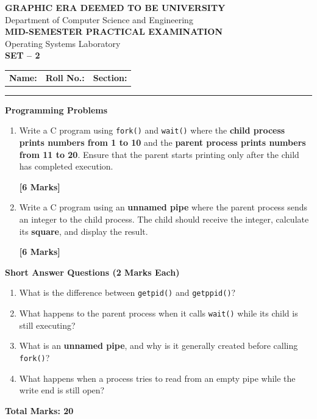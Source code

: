 \documentclass[10pt,a4paper]{article}
\makeatletter
\newcommand{\examheader}[1]{
\begin{center}
{\large\bfseries GRAPHIC ERA DEEMED TO BE UNIVERSITY}\\[-1mm]
{\small Department of Computer Science and Engineering}\\[1mm]
{\bfseries MID-SEMESTER PRACTICAL EXAMINATION}\\[-1mm]
{\small Operating Systems Laboratory}\\[1mm]
{\large\bfseries SET -- #1}
\end{center}

\vspace{-1mm}

\begin{tabular}{@{}p{0.33\textwidth}p{0.32\textwidth}p{0.31\textwidth}@{}}
\textbf{Name:} \hrulefill &
\textbf{Roll No.:} \hrulefill &
\textbf{Section:} \hrulefill
\end{tabular}

\vspace{1mm}
\hrule
\vspace{1mm}
}
\makeatother
\begin{document}

\vspace{1mm}

\noindent
{}

\vspace{1mm}


\examheader{2}

\textbf{Programming Problems}

\begin{enumerate}[leftmargin=5mm,itemsep=2pt,label=\textbf{P\arabic*.}]

\item
Write a C program using \texttt{fork()} and \texttt{wait()} where the
\textbf{child process prints numbers from 1 to 10} and the
\textbf{parent process prints numbers from 11 to 20}. Ensure that the
parent starts printing only after the child has completed execution.

\hfill\textbf{[6 Marks]}

\item
Write a C program using an \textbf{unnamed pipe} where the parent
process sends an integer to the child process. The child should receive
the integer, calculate its \textbf{square}, and display the result.

\hfill\textbf{[6 Marks]}

\end{enumerate}

\vspace{1mm}

\textbf{Short Answer Questions \hfill (2 Marks Each)}

\begin{enumerate}[leftmargin=7mm,itemsep=1pt,label=\textbf{Q\arabic*.}]

\item What is the difference between \texttt{getpid()} and
\texttt{getppid()}?

\item What happens to the parent process when it calls \texttt{wait()}
while its child is still executing?

\item What is an \textbf{unnamed pipe}, and why is it generally created
before calling \texttt{fork()}?

\item What happens when a process tries to read from an empty pipe while
the write end is still open?

\end{enumerate}

\vspace{1mm}

\begin{center}
\textbf{Total Marks: 20}
\end{center}
\end{document}
